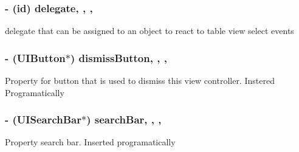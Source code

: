\subsubsection[{\texorpdfstring{delegate}{delegate}}]{\setlength{\rightskip}{0pt plus 5cm}-\/ (id) delegate\hspace{0.3cm}{\ttfamily [read]}, {\ttfamily [write]}, {\ttfamily [nonatomic]}, {\ttfamily [assign]}}\hypertarget{interface_search_table_view_controller_a135bcffaa0e477838a8b206fdcf7093d}{}\label{interface_search_table_view_controller_a135bcffaa0e477838a8b206fdcf7093d}
delegate that can be assigned to an object to react to table view select events 
\subsubsection[{\texorpdfstring{dismiss\+Button}{dismissButton}}]{\setlength{\rightskip}{0pt plus 5cm}-\/ (U\+I\+Button$\ast$) dismiss\+Button\hspace{0.3cm}{\ttfamily [read]}, {\ttfamily [write]}, {\ttfamily [nonatomic]}, {\ttfamily [retain]}}\hypertarget{interface_search_table_view_controller_aa67b44900c4bf8b61e938f0260b5edea}{}\label{interface_search_table_view_controller_aa67b44900c4bf8b61e938f0260b5edea}
Property for button that is used to dismiss this view controller. Instered Programatically 
\subsubsection[{\texorpdfstring{search\+Bar}{searchBar}}]{\setlength{\rightskip}{0pt plus 5cm}-\/ (U\+I\+Search\+Bar$\ast$) search\+Bar\hspace{0.3cm}{\ttfamily [read]}, {\ttfamily [write]}, {\ttfamily [nonatomic]}, {\ttfamily [retain]}}\hypertarget{interface_search_table_view_controller_a7c8d8568f851c6e9d91fc38117c7ba43}{}\label{interface_search_table_view_controller_a7c8d8568f851c6e9d91fc38117c7ba43}
Property search bar. Inserted programatically 
